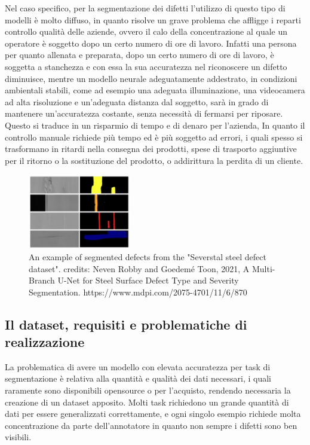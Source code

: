 Nel caso specifico, per la segmentazione dei difetti l'utilizzo di questo tipo di modelli è molto diffuso, in quanto risolve un grave problema 
che affligge i reparti controllo qualità delle aziende, ovvero il calo della concentrazione al quale un operatore è soggetto dopo un certo numero di ore di lavoro.
Infatti una persona per quanto allenata e preparata, dopo un certo numero di ore di lavoro, è soggetta a stanchezza e con essa
la sua accuratezza nel riconoscere un difetto diminuisce, mentre un modello neurale adeguatamente addestrato, in condizioni ambientali stabili,
come ad esempio una adeguata illuminazione, una videocamera ad alta risoluzione e un'adeguata distanza dal soggetto, sarà in grado di mantenere 
un'accuratezza costante, senza necessità di fermarsi per riposare. Questo si traduce in un risparmio di tempo e di denaro per l'azienda,
In quanto il controllo manuale richiede più tempo ed è più soggetto ad errori, i quali spesso si trasformano in ritardi nella consegna dei prodotti,
spese di trasporto aggiuntive per il ritorno o la sostituzione del prodotto, o addirittura la perdita di un cliente.

\begin{figure}[H]
    \centering
    \includegraphics[width=0.4\textwidth]{imgs/segm_example_1_crop.png}
    \caption{An example of segmented defects from the "Severstal steel defect dataset".
    credits: Neven Robby and Goedemé Toon, 2021, A Multi-Branch U-Net for Steel Surface Defect Type and Severity Segmentation.
    https://www.mdpi.com/2075-4701/11/6/870}
    \label{fig:segm_example_1}
\end{figure}


\subsection{Il dataset, requisiti e problematiche di realizzazione \ok}

La problematica di avere un modello con elevata accuratezza per task di segmentazione è relativa alla quantità e qualità dei dati necessari,
i quali raramente sono disponibili opensource o per l'acquisto, rendendo necessaria la creazione di un dataset apposito.
Molti task richiedono un grande quantità di dati per essere generalizzati correttamente, e ogni singolo esempio richiede molta concentrazione
da parte dell'annotatore in quanto non sempre i difetti sono ben visibili. 

